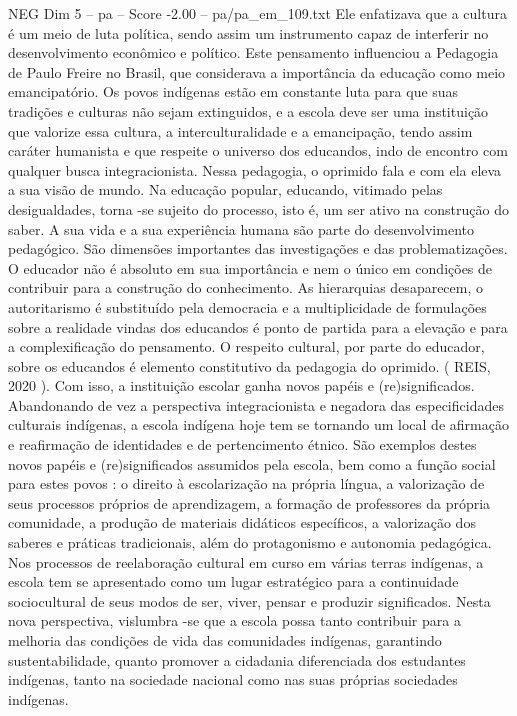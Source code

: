 \begin{textsample}{NEG Dim 5 – pa – Score -2.00 – pa/pa\_em\_109.txt}
Ele enfatizava que a cultura é um meio de luta política, sendo assim um instrumento capaz de interferir no desenvolvimento econômico e político.
Este pensamento influenciou a Pedagogia de Paulo Freire no Brasil, que considerava a importância da educação como meio emancipatório.
Os povos indígenas estão em constante luta para que suas tradições e culturas não sejam extinguidos, e a escola deve ser uma instituição que valorize essa cultura, a interculturalidade e a emancipação, tendo assim caráter humanista e que respeite o universo dos educandos, indo de encontro com qualquer busca integracionista.
Nessa pedagogia, o oprimido fala e com ela eleva a sua visão de mundo.
Na educação popular, educando, vitimado pelas desigualdades, torna -se sujeito do processo, isto é, um ser ativo na construção do saber.
A sua vida e a sua experiência humana são parte do desenvolvimento pedagógico.
São dimensões importantes das investigações e das problematizações.
O educador não é absoluto em sua importância e nem o único em condições de contribuir para a construção do conhecimento.
As hierarquias desaparecem, o autoritarismo é substituído pela democracia e a multiplicidade de formulações sobre a realidade vindas dos educandos é ponto de partida para a elevação e para a complexificação do pensamento.
O respeito cultural, por parte do educador, sobre os educandos é elemento constitutivo da pedagogia do oprimido. ( REIS, 2020 ).
Com isso, a instituição escolar ganha novos papéis e (re)significados.
Abandonando de vez a perspectiva integracionista e negadora das especificidades culturais indígenas, a escola indígena hoje tem se tornando um local de afirmação e reafirmação de identidades e de pertencimento étnico.
São exemplos destes novos papéis e (re)significados assumidos pela escola, bem como a função social para estes povos : o direito à escolarização na própria língua, a valorização de seus processos próprios de aprendizagem, a formação de professores da própria comunidade, a produção de materiais didáticos específicos, a valorização dos saberes e práticas tradicionais, além do protagonismo e autonomia pedagógica.
Nos processos de reelaboração cultural em curso em várias terras indígenas, a escola tem se apresentado como um lugar estratégico para a continuidade sociocultural de seus modos de ser, viver, pensar e produzir significados.
Nesta nova perspectiva, vislumbra -se que a escola possa tanto contribuir para a melhoria das condições de vida das comunidades indígenas, garantindo sustentabilidade, quanto promover a cidadania diferenciada dos estudantes indígenas, tanto na sociedade nacional como nas suas próprias sociedades indígenas.

\end{textsample}
